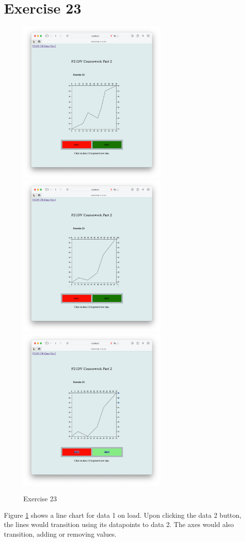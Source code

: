 \documentclass{scrreprt}
\begin{document}
\newpage
\section{Exercise 23}
\begin{figure}[!ht]
    \centering
    \includegraphics[width = 7.5cm]{images/ex23_1.png}
    \includegraphics[width = 7.5cm]{images/ex23_2.png}
    \includegraphics[width = 7.5cm]{images/ex23_3.png}
    \label{fig:ex23}
    \caption{Exercise 23}
\end{figure}
\FloatBarrier
% 
Figure \ref{fig:ex23} shows a line chart for data 1 on load. Upon clicking the data 2 button, the lines would transition using its datapoints to data 2. The axes would also transition, adding or removing values.
\end{document}
